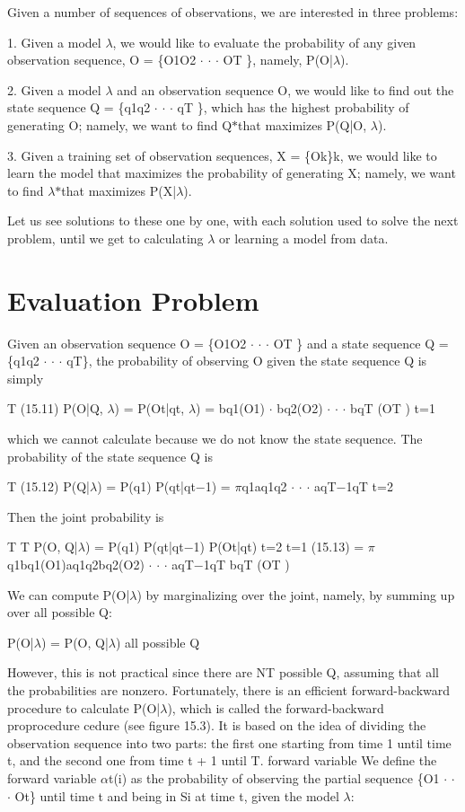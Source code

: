 Given a number of sequences of observations, we are interested in three problems:

1. Given a model $\lambda$, we would like to evaluate the probability of any given observation sequence, O = \{O1O2 $\cdot$ $\cdot$ $\cdot$ OT \}, namely, P(O|$\lambda$).

2. Given a model $\lambda$ and an observation sequence O, we would like to find out the state sequence Q = \{q1q2 $\cdot$ $\cdot$ $\cdot$ qT \}, which has the highest probability of generating O; namely, we want to find Q$*$that maximizes P(Q|O, $\lambda$).

3. Given a training set of observation sequences, X = \{Ok\}k, we would like to learn the model that maximizes the probability of generating X; namely, we want to find $\lambda$$*$that maximizes P(X|$\lambda$).

Let us see solutions to these one by one, with each solution used to solve the next problem, until we get to calculating $\lambda$ or learning a model from data.

\section{Evaluation Problem}

Given an observation sequence O = \{O1O2 $\cdot$ $\cdot$ $\cdot$ OT \} and a state sequence Q = \{q1q2 $\cdot$ $\cdot$ $\cdot$ qT\}, the probability of observing O given the state sequence Q is simply

T (15.11) P(O|Q, $\lambda$) = P(Ot|qt, $\lambda$) = bq1(O1) $\cdot$ bq2(O2) $\cdot$ $\cdot$ $\cdot$ bqT (OT ) t=1

which we cannot calculate because we do not know the state sequence. The probability of the state sequence Q is

T (15.12) P(Q|$\lambda$) = P(q1) P(qt|qt$-$1) = $\pi$q1aq1q2 $\cdot$ $\cdot$ $\cdot$ aqT$-$1qT t=2

Then the joint probability is

T T P(O, Q|$\lambda$) = P(q1) P(qt|qt$-$1) P(Ot|qt) t=2 t=1 (15.13) = $\pi$q1bq1(O1)aq1q2bq2(O2) $\cdot$ $\cdot$ $\cdot$ aqT$-$1qT bqT (OT )

We can compute P(O|$\lambda$) by marginalizing over the joint, namely, by summing up over all possible Q:

P(O|$\lambda$) = P(O, Q|$\lambda$) all possible Q

However, this is not practical since there are NT possible Q, assuming that all the probabilities are nonzero. Fortunately, there is an efficient forward-backward procedure to calculate P(O|$\lambda$), which is called the forward-backward proprocedure cedure (see figure 15.3). It is based on the idea of dividing the observation sequence into two parts: the first one starting from time 1 until time t, and the second one from time t + 1 until T. forward variable We define the forward variable $\alpha$t(i) as the probability of observing the partial sequence \{O1 $\cdot$ $\cdot$ $\cdot$ Ot\} until time t and being in Si at time t, given the model $\lambda$:

